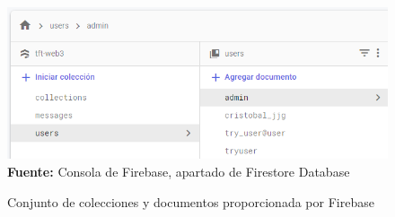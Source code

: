 \begin{figure}[htb!]
    \centering
    \caption{Conjunto de colecciones y documentos proporcionada por Firebase}
    \label{fig:firebase-almacenamiento}
    \centering
    \includegraphics[scale=0.75]{./Ilustraciones/almacenamiento.png}\\
    \textbf{Fuente:} Consola de Firebase, apartado de Firestore Database
\end{figure}